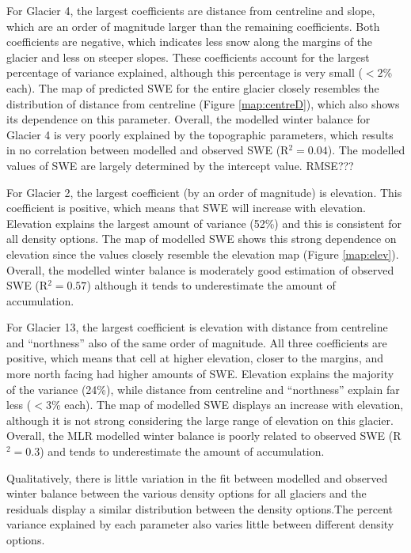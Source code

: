 \documentclass[12pt]{article}
\begin{document}
For Glacier 4, the largest coefficients are distance from centreline and slope, which are an order of magnitude larger than the remaining coefficients. Both coefficients are negative, which indicates less snow along the margins of the glacier and less on steeper slopes. These coefficients account for the largest percentage of variance explained, although this percentage is very small ($<2$\% each). The map of predicted SWE for the entire glacier closely resembles the distribution of distance from centreline (Figure \ref{map:centreD}), which also shows its dependence on this parameter. Overall, the modelled winter balance for Glacier 4 is very poorly explained by the topographic parameters, which results in no correlation between modelled and observed SWE (R$^2=0.04$). The modelled values of SWE are largely determined by the intercept value. RMSE???

For Glacier 2, the largest coefficient (by an order of magnitude) is elevation. This coefficient is positive, which means that SWE will increase with elevation. Elevation explains the largest amount of variance (52\%) and this is consistent for all density options. The map of modelled SWE shows this strong dependence on elevation since the values closely resemble the elevation map (Figure \ref{map:elev}). Overall, the modelled winter balance is moderately good estimation of observed SWE (R$^2=0.57$) although it tends to underestimate the amount of accumulation. 

For Glacier 13, the largest coefficient is elevation with distance from centreline and ``northness'' also of the same order of magnitude. All three coefficients are positive, which means that cell at higher elevation, closer to the margins, and more north facing had higher amounts of SWE. Elevation explains the majority of the variance (24\%), while distance from centreline and ``northness'' explain far less ($<$3\% each). The map of modelled SWE displays an increase with elevation, although it is not strong considering the large range of elevation on this glacier. Overall, the MLR modelled winter balance is poorly related to observed SWE (R$^2=0.3$) and tends to underestimate the amount of accumulation.

Qualitatively, there is little variation in the fit between modelled and observed winter balance between the various density options for all glaciers and the residuals display a similar distribution between the density options.The percent variance explained by each parameter also varies little between different density options. 
\end{document}
